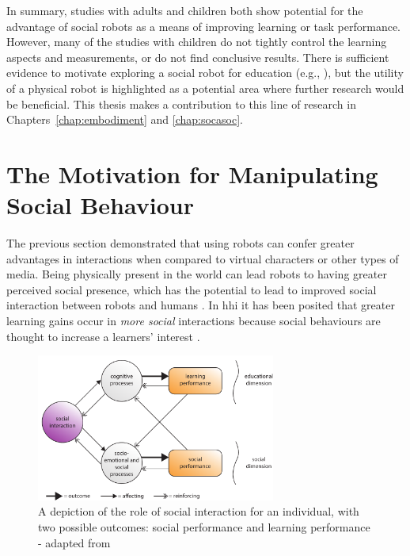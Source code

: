 In summary, studies with adults and children both show potential for the advantage of social robots as a means of improving learning or task performance. However, many of the studies with children do not tightly control the learning aspects and measurements, or do not find conclusive results. There is sufficient evidence to motivate exploring a social robot for education (e.g., \citealp{alemi2014employing,han2008comparative}), but the utility of a physical robot is highlighted as a potential area where further research would be beneficial. This thesis makes a contribution to this line of research in Chapters~\ref{chap:embodiment} and \ref{chap:socasoc}.


\section{The Motivation for Manipulating Social Behaviour}\label{sec:background-behave}
The previous section demonstrated that using robots can confer greater advantages in interactions when compared to virtual characters or other types of media. Being physically present in the world can lead robots to having greater perceived social presence, which has the potential to lead to improved social interaction between robots and humans \citep{jung2004effects, wainer2007embodiment}. In \acrshort{hhi} it has been posited that greater learning gains occur in \textit{more social} interactions because social behaviours are thought to increase a learners' interest \citep{atkinson2005fostering}.

\begin{figure}[h]
    \centering
    \includegraphics[width=0.7\textwidth]{images/ch2_SocialInt.pdf}
    \caption{A depiction of the role of social interaction for an individual, with two possible outcomes: social performance and learning performance - adapted from \cite{kreijns2003identifying}}
    \label{fig:ch2-rolesocial}
\end{figure}

